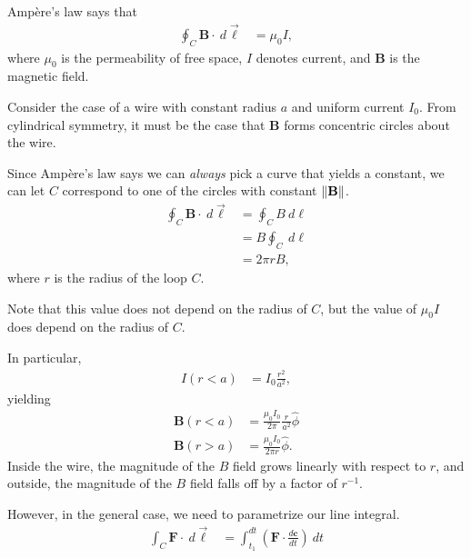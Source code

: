 \documentclass[10pt]{mypackage}
\begin{document}
\begin{example}
  Ampère's law says that
  \begin{align*}
    \oint_{C}^{} \mathbf{B}\cdot \:d\vec{\ell} &= \mu_0 I,
  \end{align*}
  where $\mu_0$ is the permeability of free space, $I$ denotes current, and $\mathbf{B}$ is the magnetic field.\newline

  Consider the case of a wire with constant radius $a$ and uniform current $I_0$. From cylindrical symmetry, it must be the case that $\mathbf{B}$ forms concentric circles about the wire.\newline

  Since Ampère's law says we can \textit{always} pick a curve that yields a constant, we can let $C$ correspond to one of the circles with constant $\norm{\mathbf{B}}$.
  \begin{align*}
    \oint_{C}^{} \mathbf{B}\cdot\:d\vec{\ell} &= \oint_{C}^{} B\:d\ell\\
                                             &= B\oint_{C}^{} \:d\ell\\
                                             &= 2\pi r B,
  \end{align*}
  where $r$ is the radius of the loop $C$.\newline

  Note that this value does not depend on the radius of $C$, but the value of $\mu_0 I$ does depend on the radius of $C$.\newline

  In particular,
  \begin{align*}
    I\left(r < a\right) &= I_0\frac{r^2}{a^2},
  \end{align*}
  yielding
  \begin{align*}
    \mathbf{B}\left(r < a\right) &= \frac{\mu_0 I_0}{2\pi}\frac{r}{a^2}\widehat{\phi}\\
    \mathbf{B}\left(r > a\right) &= \frac{\mu_0I_0}{2\pi r} \widehat{\phi}.
  \end{align*}
  Inside the wire, the magnitude of the $B$ field grows linearly with respect to $r$, and outside, the magnitude of the $B$ field falls off by a factor of $r^{-1}$.
\end{example}
However, in the general case, we need to parametrize our line integral.
\begin{align*}
  \int_{C}^{} \mathbf{F}\cdot\:d\vec{\ell} &= \int_{t_1}^{dt} \left(\mathbf{F}\cdot \frac{d\mathbf{c}}{dt}\right)\:dt
\end{align*}
\end{document}
